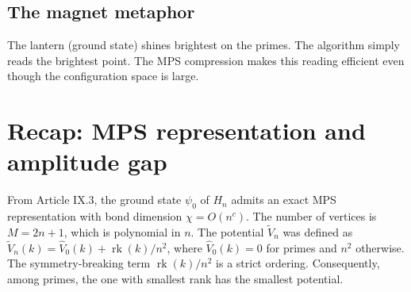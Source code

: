 \documentclass[11pt,a4paper]{article}
\begin{document}
\subsection{The magnet metaphor}

The lantern (ground state) shines brightest on the primes. The algorithm simply reads the brightest point. The MPS compression makes this reading efficient even though the configuration space is large.

\section{Recap: MPS representation and amplitude gap}

From Article IX.3, the ground state \(\psi_0\) of \(H_n\) admits an exact MPS representation with bond dimension \(\chi = O(n^c)\). The number of vertices is \(M = 2n+1\), which is polynomial in \(n\). The potential \(\tilde{V}_n\) was defined as \(\tilde{V}_n(k) = \hat{V}_0(k) + \operatorname{rk}(k)/n^2\), where \(\hat{V}_0(k)=0\) for primes and \(n^2\) otherwise. The symmetry‑breaking term \(\operatorname{rk}(k)/n^2\) is a strict ordering. Consequently, among primes, the one with smallest rank has the smallest potential.
\end{document}
